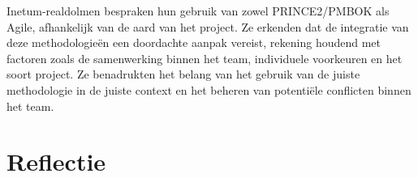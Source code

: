 \documentclass[dutch]{hogent-article}
\begin{document}
Inetum-realdolmen bespraken hun gebruik van zowel PRINCE2/PMBOK als Agile, afhankelijk van de aard van het project. Ze erkenden dat de integratie van deze methodologieën een doordachte aanpak vereist, rekening houdend met factoren zoals de samenwerking binnen het team, individuele voorkeuren en het soort project. Ze benadrukten het belang van het gebruik van de juiste methodologie in de juiste context en het beheren van potentiële conflicten binnen het team.
\newline



\section{Reflectie}
\label{sec:reflectie}

\printbibliography[heading=bibintoc]
\end{document}
